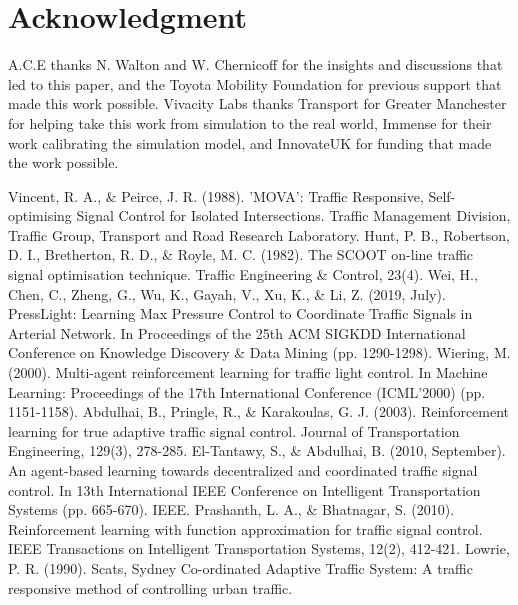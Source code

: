 \documentclass[conference]{IEEEtran}
\begin{document}
\section*{Acknowledgment}

A.C.E thanks N. Walton and W. Chernicoff for the insights and discussions that led to this paper, and the Toyota Mobility Foundation for previous support that made this work possible. Vivacity Labs thanks Transport for Greater Manchester for helping take this work from simulation to the real world, Immense for their work calibrating the simulation model, and InnovateUK for funding that made the work possible.

\addtolength{\textheight}{-9.5cm} 

\begin{thebibliography}{00}
 Vincent, R. A., \& Peirce, J. R. (1988). 'MOVA': Traffic Responsive, Self-optimising Signal Control for Isolated Intersections. Traffic Management Division, Traffic Group, Transport and Road Research Laboratory.
 Hunt, P. B., Robertson, D. I., Bretherton, R. D., \& Royle, M. C. (1982). The SCOOT on-line traffic signal optimisation technique. Traffic Engineering \& Control, 23(4).
 Wei, H., Chen, C., Zheng, G., Wu, K., Gayah, V., Xu, K., \& Li, Z. (2019, July). PressLight: Learning Max Pressure Control to Coordinate Traffic Signals in Arterial Network. In Proceedings of the 25th ACM SIGKDD International Conference on Knowledge Discovery \& Data Mining (pp. 1290-1298).
 Wiering, M. (2000). Multi-agent reinforcement learning for traffic light control. In Machine Learning: Proceedings of the 17th International Conference (ICML'2000) (pp. 1151-1158).
 Abdulhai, B., Pringle, R., \& Karakoulas, G. J. (2003). Reinforcement learning for true adaptive traffic signal control. Journal of Transportation Engineering, 129(3), 278-285.
 El-Tantawy, S., \& Abdulhai, B. (2010, September). An agent-based learning towards decentralized and coordinated traffic signal control. In 13th International IEEE Conference on Intelligent Transportation Systems (pp. 665-670). IEEE.
 Prashanth, L. A., \& Bhatnagar, S. (2010). Reinforcement learning with function approximation for traffic signal control. IEEE Transactions on Intelligent Transportation Systems, 12(2), 412-421.
 Lowrie, P. R. (1990). Scats, Sydney Co-ordinated Adaptive Traffic System: A traffic responsive method of controlling urban traffic.

\end{thebibliography}
\end{document}
